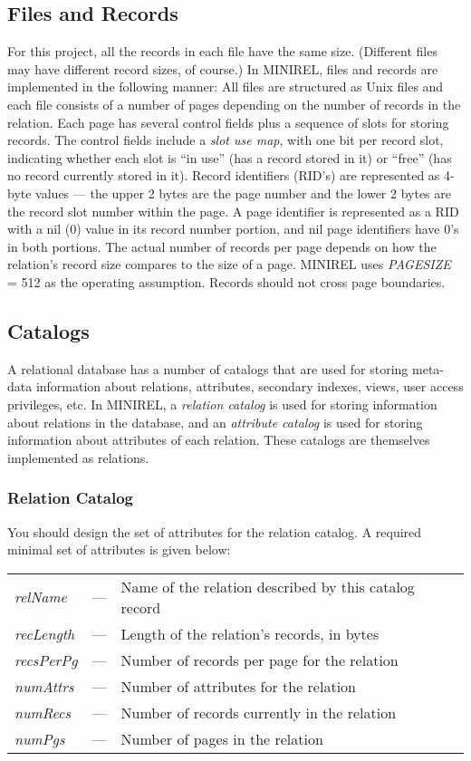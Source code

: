 \subsection{Files and Records}
For this project, all the records in each file have the same size.
(Different files may have different record sizes, of course.) In
MINIREL, files and records are implemented in the following manner:
All files are structured as Unix files and each file consists of a
number of pages depending on the number of records in the relation.
Each page has several control fields plus a sequence of slots for
storing records.  The control fields include a \emph{slot use map},
with one bit per record slot, indicating whether each slot is ``in
use'' (has a record stored in it) or ``free'' (has no record currently
stored in it).  Record identifiers (RID's) are represented as 4-byte
values --- the upper 2 bytes are the page number and the lower 2 bytes
are the record slot number within the page.  A page identifier is
represented as a RID with a nil (0) value in its record number portion,
and nil page identifiers have 0's in both portions.  The actual number
of records per page depends on how the relation's record size compares
to the size of a page.  MINIREL uses \emph{PAGESIZE} = 512 as the
operating assumption.  Records should not cross page boundaries.


\subsection{Catalogs}
A relational database has a number of catalogs that are used for
storing meta-data information about relations, attributes, secondary
indexes, views, user access privileges, etc.  In MINIREL, a
\emph{relation catalog} is used for storing information about relations
in the database, and an \emph{attribute catalog} is used for storing
information about attributes of each relation.  These catalogs are
themselves implemented as relations.

\subsubsection{Relation Catalog}
You should design the set of attributes for the relation catalog.
A required minimal set of attributes is given below:
\begin{center}
\begin{tabular}{l l l}
\emph{relName} &---& Name of the relation described by this catalog record
\\
\emph{recLength} &---& Length of the relation's records, in bytes
\\
\emph{recsPerPg} &---& Number of records per page for the relation
\\
\emph{numAttrs} &---& Number of attributes for the relation
\\
\emph{numRecs} &---& Number of records currently in the relation
\\
\emph{numPgs} &---& Number of pages in the relation
\end{tabular}
\end{center}

